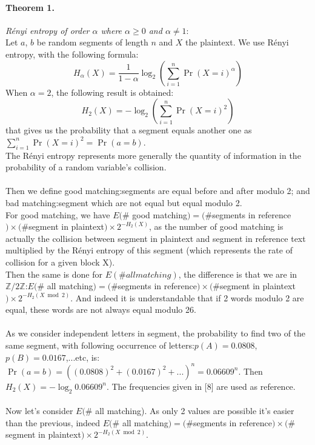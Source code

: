 \documentclass{article}
\begin{document}
\paragraph{Theorem 1.}\textit{R\'enyi entropy of order $\alpha$ where $\alpha \geq 0$ and $\alpha \neq 1$}:
\\
Let $a$, $b$ be random segments of length $n$ and $X$ the plaintext. We use R\'enyi entropy, with the following formula:\\
$$H_{\alpha}(X) = \frac{1}{1-\alpha}\log_{2}(\sum_{i=1}^{n}{\Pr(X=i)^{\alpha}})$$ 
When $\alpha = 2$, the following result is obtained:
$$H_{2}(X) = -\log_{2}(\sum_{i=1}^{n}{\Pr(X=i)^{2}})$$ that gives us the probability that a segment equals another one as $\sum_{i=1}^{n}{\Pr(X=i)^{2}} =\Pr(a=b)$.\\
The R\'enyi entropy represents more generally the quantity of information in the probability of a random variable's collision.\\
\\
Then we define good matching:segments are equal before and after modulo 2; and bad matching:segment which are not equal but equal modulo 2.\\
${}$\hspace{1em}For good matching, we have $E(\#$ good matching$) = (\# $segments in reference$) \times (\#$segment in plaintext$) \times 2^{-H_{2}(X)}$, as the number of good matching is actually the collision between segment in plaintext and segment in reference text multiplied by the R\'enyi entropy of this segment (which represents the rate of collision for a given block X).\\
Then the same is done for  $E(\# all matching)$, the difference is that we are in $\mathbb{Z}/2\mathbb{Z}$:$E(\#$ all matching$) = (\# $segments in reference$) \times (\#$segment in plaintext$) \times 2^{-H_{2}(X \bmod 2)}$. And indeed it is understandable that if 2 words modulo 2 are equal, these words are not always equal modulo 26.\\
\\
As we consider independent letters in segment, the probability to find two of the same segment, with following occurrence of letters:$p(A)=0.0808$, $p(B)=0.0167$,...etc, is:$\Pr(a=b)=((0.0808)^{2} +(0.0167)^{2} +...)^{n} =0.06609^{n}$. Then $H_{2}(X) = -\log_{2}0.06609^{n}$. The frequencies given in [8] are used as reference.\\
\\
${}$\hspace{1em}Now let's consider $E(\#$ all matching). As only 2 values are possible it's easier than the previous, indeed $E(\#$ all matching$) =(\# $segments in reference$) \times (\#$segment in plaintext$) \times 2^{-H_{2}(X \bmod 2)}$.\\
\end{document}
